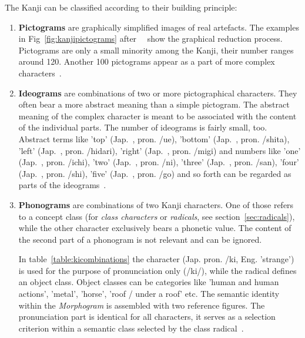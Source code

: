 The Kanji can be classified according to their building principle:
\begin{enumerate}
 \item \textbf{Pictograms} are graphically simplified images of real artefacts.
       The examples in Fig~\ref{fig:kanjipictograms} 
       after~~\citeyear{Kano1990} show the graphical 
       reduction process. Pictograms are only a small minority among the Kanji,
       their number ranges around 120. Another 100 pictograms appear as a part of
       more complex characters~.
       
 \item \textbf{Ideograms} are combinations of two or more pictographical
       characters. They often bear a more abstract meaning than a simple 
       pictogram. The abstract meaning of the complex character is meant to be 
       associated with the content of the individual parts. The number of 
       ideograms is fairly small, too. Abstract terms like 
       'top' (Jap.~, pron. /ue), 
       'bottom' (Jap.~, pron. /shita),
       'left' (Jap.~, pron. /hidari),
       'right' (Jap.~, pron. /migi)
       and numbers like
       'one' (Jap.~, pron. /ichi),
       'two' (Jap.~, pron. /ni),
       'three' (Jap.~, pron. /san),
       'four' (Jap.~, pron. /shi),
       'five' (Jap.~, pron. /go)
       and so forth can be regarded as parts of the 
       ideograms~.

 \item \textbf{Phonograms} are combinations of two Kanji characters. One of those
       refers to a concept class (for \emph{class characters} or \emph{radicals},
       see section~\ref{sec:radicals}), 
       while the other character exclusively bears a phonetic value. The content
       of the second part of a phonogram is not relevant and can be ignored.

       In table~\ref{table:kicombinations} the character 
        (Jap. pron. /ki, Eng. 'strange') is used for the purpose
       of pronunciation only (/ki/), while the radical defines an
       object class. Object classes can be categories like 'human and human 
       actions', 'metal', 'horse', 'roof / under a roof' etc.
       The semantic identity within the \emph{Morphogram} is assembled with two
       reference figures. The pronunciation part is identical for all characters,
       it serves as a selection criterion within a semantic class selected by 
       the class radical~.

\end{enumerate}

